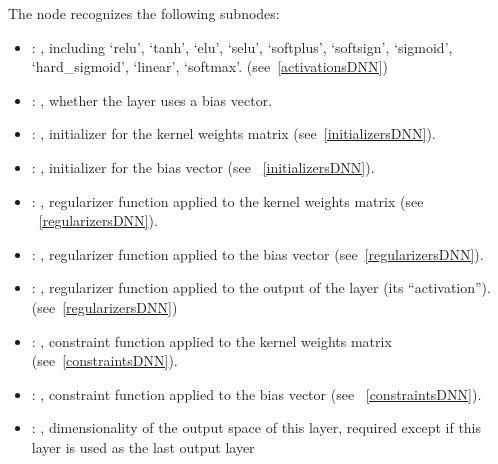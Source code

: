 \begin{itemize}
      The  node recognizes the following subnodes:
      \begin{itemize}
        \item {}: , 
          including {`relu', `tanh', `elu', `selu', `softplus', `softsign', `sigmoid',
          `hard\_sigmoid', `linear', `softmax'}.         (see~\ref{activationsDNN})

        \item {}: , 
          whether the layer uses a bias vector.

        \item {}: , 
          initializer for the kernel weights matrix (see~\ref{initializersDNN}).

        \item {}: , 
          initializer for the bias vector (see ~\ref{initializersDNN}).

        \item {}: , 
          regularizer function applied to the kernel weights matrix (see ~\ref{regularizersDNN}).

        \item {}: , 
          regularizer function applied to the bias vector (see~\ref{regularizersDNN}).

        \item {}: , 
          regularizer function applied to the output         of the layer (its ``activation'').
          (see~\ref{regularizersDNN})

        \item {}: , 
          constraint function applied to the kernel weights         matrix
          (see~\ref{constraintsDNN}).

        \item {}: , 
          constraint function applied to the bias vector         (see ~\ref{constraintsDNN}).

        \item {}: , 
          dimensionality of the output space of this layer, required except if this layer is used as
          the last output layer
      \end{itemize}


\end{itemize}
